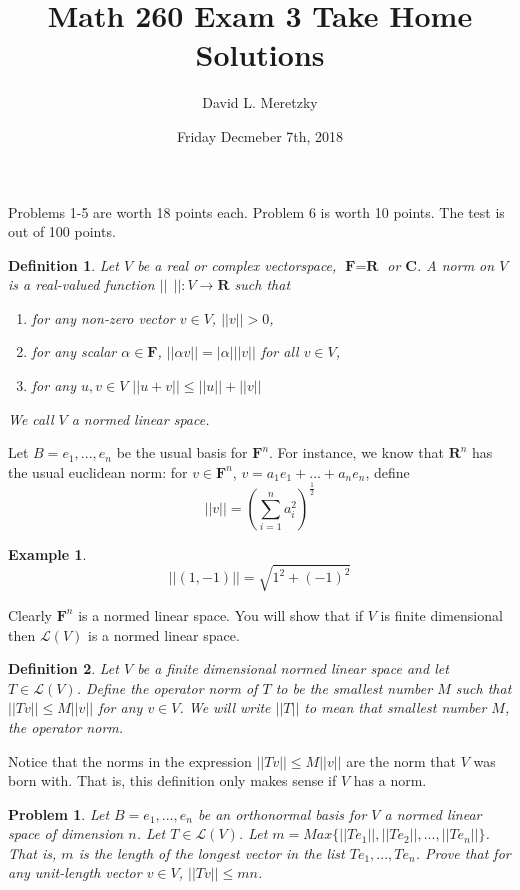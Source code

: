 \documentclass{article}
\title{ \vspace{-10ex} %
Math 260 Exam 3 Take Home Solutions
}
\author{David L. Meretzky
}
\date{%
Friday Decmeber 7th, 2018
}
\theoremstyle{problemstyle}
\newtheorem{problem}{Problem}
\theoremstyle{problemstyle}
\theoremstyle{problemstyle}
\newtheorem{example}{Example}
\theoremstyle{problemstyle}
\newtheorem{definition}{Definition}
\begin{document}
\maketitle

\noindent
Problems 1-5 are worth 18 points each. Problem 6 is worth 10 points. The test is out of 100 points. 

\begin{definition}
Let $V$ be a real or complex vectorspace, $\textbf{F} = \textbf{R}$ or $\textbf{C}$. A norm on $V$ is a real-valued function $||\ \  ||:V \rightarrow \textbf{R}$ such that 
\begin{enumerate}
\item for any non-zero vector $v \in V$, $||v|| > 0$, 
\item for any scalar $\alpha \in \textbf{F}$, $||\alpha v|| = |\alpha|||v||$ for all $v \in V$,
\item for any $u,v \in V$ $||u+v|| \leq ||u|| + ||v||$
\end{enumerate}
We call $V$ a normed linear space. 
\end{definition}


\flushleft
Let $B = e_1,...,e_n$ be the usual basis for $\textbf{F}^n$. For instance, we know that $\textbf{R}^n$ has the usual euclidean norm: for $v \in  \textbf{F}^n$, $v = a_1e_1 +...+a_ne_n$, define 
\begin{equation}||v|| = (\sum_{i = 1}^na_i^2)^{\frac{1}{2}}\end{equation}

\begin{example}
$$||(1,-1)|| = \sqrt{1^2+(-1)^2}$$
\end{example}

Clearly $\textbf{F}^n$ is a normed linear space. You will show that if $V$ is finite dimensional then $\mathscr{L}(V)$ is a normed linear space. 

\begin{definition}
Let $V$ be a finite dimensional normed linear space and let  $T \in \mathscr{L}(V)$. Define the operator norm of $T$ to be the smallest number $M$ such that $||Tv|| \leq M||v||$ for any $v \in V$. We will write $||T||$ to mean that smallest number $M$, the operator norm. 
\end{definition}

\flushleft
Notice that the norms in the expression $||Tv|| \leq M||v||$ are the norm that $V$ was born with. That is, this definition only makes sense if $V$ has a norm. 

\begin{problem}
Let $B = e_1,...,e_n$ be an orthonormal basis for $V$ a normed linear space of dimension $n$. Let $T \in \mathscr{L}(V)$. Let $m = Max\{||Te_1||,||Te_2||,...,||Te_n||\}$. That is, $m$ is the length of the longest vector in the list $Te_1,...,Te_n$. Prove that for any unit-length vector $v \in V$, $||Tv|| \leq mn$. 
\end{problem}
\end{document}
